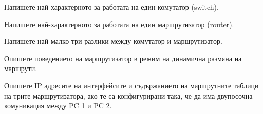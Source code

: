 \begin{questions}
  \question Напишете най-характерното за работата на един комутатор
  (\foreignlanguage{english}{switch}).


  \question Напишете най-характерното за работата на един маршрутизатор
  (\foreignlanguage{english}{router}).

  \question Напишете най-малко три разлики между комутатор и маршрутизатор.

  \question Опишете поведението на маршрутизатор в режим на динамична размяна на
  маршрути.

  \question Опишете IP адресите на интерфейсите и съдържанието на маршрутните
  таблици на трите маршрутизатора, ако те са конфигурирани така, че да има
  двупосочна комуникация между PC 1 и PC 2.

  \begin{center}
\end{center}
\end{questions}
